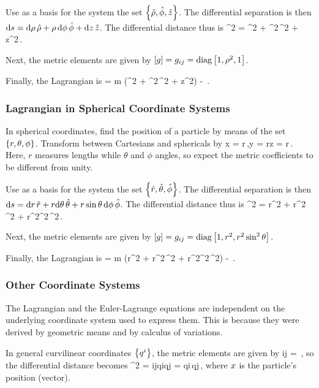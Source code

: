 Use as a basis for the system the set $\left\lbrace{\hat{\rho}, \hat{\phi}, \hat{z}}\right\rbrace$. The differential separation is then $\text{d}s = \text{d}\rho\,\hat{\rho} + \rho\,\text{d}\phi\,\hat{\phi} + \text{d} z\,\hat{z}$. The differential distance thus is
\beq
\dx\svec^2 = \dx\rho^2 + \rho^2\,\dx\phi^2 + \dx z^2\,.
\eeq

Next, the metric elements are given by $\left[{g}\right] = g_{{i}{j}} = \operatorname{diag}\left[{1, \rho^2, 1}\right]$. 

Finally, the Lagrangian is 
\beq
\lag =  m (\dt\rho^2 + \rho^2\,\dt\phi^2 + \dt z^2) - \pen{} \,.
\eeq


\subsubsection{Lagrangian in Spherical Coordinate Systems}
In spherical coordinates, find the position of a particle by means of the set $\left\lbrace{r,\theta,\phi}\right\rbrace$. Transform between Cartesians and sphericals by
\beq
x = r\sin\theta\cos\phi\,,\qquad y = r\sin\theta\sin\phi\qquad{}\qquad z = r\cos\theta\,.
\eeq
Here, $r$ measures lengths while $\theta$ and $\phi$ angles, so expect the metric coefficients to be different from unity.

Use as a basis for the system the set $\left\lbrace{\hat{r}, \hat{\theta}, \hat{\phi}}\right\rbrace$. The differential separation is then $\text{d}s = \text{d} r\,\hat{r} + r\text{d}\theta\,\hat{\theta} + r\sin\theta\,\text{d}\phi\,\hat{\phi}$. The differential distance thus is
\beq
\dx\svec^2 = \dx r^2 + r^2\,\dx\theta^2 + r^2\sin^2\theta\,\dx\phi^2\,.
\eeq

Next, the metric elements are given by $\left[{g}\right] = g_{{i}{j}} = \operatorname{diag}\left[{1, r^2, r^2\sin^2\theta}\right]$. 

Finally, the Lagrangian is 
\beq
\lag =  m (\dt r^2 + r^2\,\dt\theta^2 + r^2\sin^2\theta\,\dt\phi^2) - \pen{} \,.
\eeq


\subsubsection{Other Coordinate Systems}
The Lagrangian and the Euler-Lagrange equations are independent on the underlying coordinate system used to express them. This is because they were derived by geometric means and by calculus of variations.

In general curvilinear coordinates $\left\lbrace{{q}^{i}}\right\rbrace$, the metric elements are given by
\beq
\imet ij = \iprod{}\,,
\eeq
so the differential distance becomes
\beq
\dx\svec^2 = \imet ij\dx\comp qi\dx\comp qj 
           = \iprod{}\;\dx\comp qi\,\dx\comp qj\,,
\eeq
where $x$ is the particle's position (vector).


